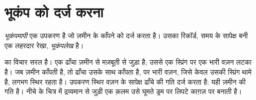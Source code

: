 \section{भूकंप को दर्ज करना}

\begin{definition}[भूकंपमापी और भूकंपलेख]\label{def:g7:earthquakes:seismometer}
\emph{भूकंपमापी} एक उपकरण है जो ज़मीन के काँपने को दर्ज करता
है। उसका रिकॉर्ड, समय के सापेक्ष बनी एक लहरदार रेखा,
\emph{भूकंपलेख} है।
\end{definition}

 का विचार सरल है। एक ढाँचा ज़मीन से मज़बूती से जुड़ा है; उससे एक स्प्रिंग
पर एक भारी वज़न लटका है। जब ज़मीन काँपती है, तो ढाँचा उसके साथ काँपता है, पर भारी
वज़न, जिसे केवल उसकी स्प्रिंग थामे है, लगभग स्थिर रहता है। उपकरण स्थिर वज़न के
सापेक्ष ढाँचे की गति दर्ज करता है: यही ज़मीन की गति है। नीचे के चित्र में द्रव्यमान
से जुड़ी एक क़लम उसे घूमते ड्रम पर लिपटे काग़ज़ पर
बनाती है।

